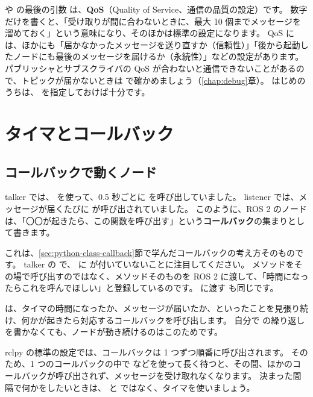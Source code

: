 \begin{point}[QoS]
   や  の最後の引数  は、\textbf{QoS}（Quality of Service、通信の品質の設定）です。
  数字だけを書くと、「受け取りが間に合わないときに、最大 10 個までメッセージを溜めておく」という意味になり、そのほかは標準の設定になります。
  QoS には、ほかにも「届かなかったメッセージを送り直すか（信頼性）」「後から起動したノードにも最後のメッセージを届けるか（永続性）」などの設定があります。
  パブリッシャとサブスクライバの QoS が合わないと通信できないことがあるので、トピックが届かないときは  で確かめましょう（\ref{chap:debug}章）。
  はじめのうちは、 を指定しておけば十分です。
\end{point}

\section{タイマとコールバック}
\label{sec:rclpy-timer}

\subsection{コールバックで動くノード}

talker では、 を使って、0.5 秒ごとに  を呼び出していました。
listener では、メッセージが届くたびに  が呼び出されていました。
このように、ROS 2 のノードは、「〇〇が起きたら、この関数を呼び出す」という\textbf{コールバック}の集まりとして書きます。

これは、\ref{sec:python-class-callback}節で学んだコールバックの考え方そのものです。
talker の  で、 に \cmd{()} が付いていないことに注目してください。
メソッドをその場で呼び出すのではなく、メソッドそのものを ROS 2 に渡して、「時間になったらこれを呼んでほしい」と登録しているのです。
 に渡す  も同じです。

 は、タイマの時間になったか、メッセージが届いたか、といったことを見張り続け、何かが起きたら対応するコールバックを呼び出します。
自分で  の繰り返しを書かなくても、ノードが動き続けるのはこのためです。

\begin{caution}[コールバックの中で長く待たない]
  rclpy の標準の設定では、コールバックは 1 つずつ順番に呼び出されます。
  そのため、1 つのコールバックの中で  などを使って長く待つと、その間、ほかのコールバックが呼び出されず、メッセージを受け取れなくなります。
  決まった間隔で何かをしたいときは、 と  ではなく、タイマを使いましょう。
\end{caution}

